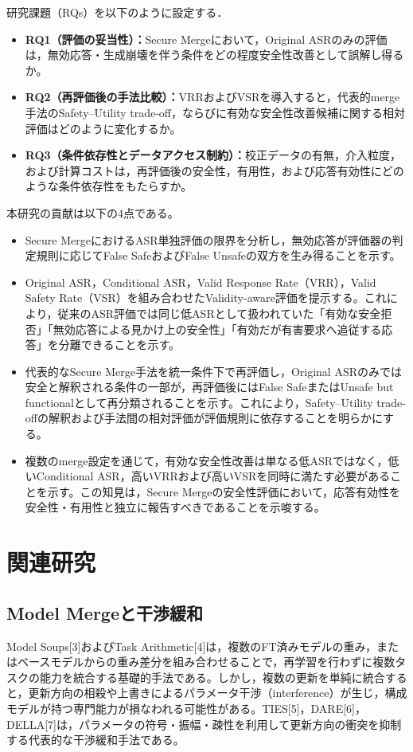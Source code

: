 \documentclass{article}
\begin{document}
研究課題（RQs）を以下のように設定する．
\begin{itemize}
    \item \textbf{RQ1（評価の妥当性）：}Secure Mergeにおいて，Original ASRのみの評価は，無効応答・生成崩壊を伴う条件をどの程度安全性改善として誤解し得るか。
    \item \textbf{RQ2（再評価後の手法比較）：}VRRおよびVSRを導入すると，代表的merge手法のSafety--Utility trade-off，ならびに有効な安全性改善候補に関する相対評価はどのように変化するか。
    \item \textbf{RQ3（条件依存性とデータアクセス制約）：}校正データの有無，介入粒度，および計算コストは，再評価後の安全性，有用性，および応答有効性にどのような条件依存性をもたらすか。
\end{itemize}

本研究の貢献は以下の4点である。
\begin{itemize}
    \item Secure MergeにおけるASR単独評価の限界を分析し，無効応答が評価器の判定規則に応じてFalse SafeおよびFalse Unsafeの双方を生み得ることを示す。
    \item Original ASR，Conditional ASR，Valid Response Rate（VRR），Valid Safety Rate（VSR）を組み合わせたValidity-aware評価を提示する。これにより，従来のASR評価では同じ低ASRとして扱われていた「有効な安全拒否」「無効応答による見かけ上の安全性」「有効だが有害要求へ追従する応答」を分離できることを示す。
    \item 代表的なSecure Merge手法を統一条件下で再評価し，Original ASRのみでは安全と解釈される条件の一部が，再評価後にはFalse SafeまたはUnsafe but functionalとして再分類されることを示す。これにより，Safety--Utility trade-offの解釈および手法間の相対評価が評価規則に依存することを明らかにする。
    \item 複数のmerge設定を通じて，有効な安全性改善は単なる低ASRではなく，低いConditional ASR，高いVRRおよび高いVSRを同時に満たす必要があることを示す。この知見は，Secure Mergeの安全性評価において，応答有効性を安全性・有用性と独立に報告すべきであることを示唆する。
\end{itemize}


\section{関連研究}
\subsection{Model Mergeと干渉緩和}
Model Soups[3]およびTask Arithmetic[4]は，複数のFT済みモデルの重み，またはベースモデルからの重み差分を組み合わせることで，再学習を行わずに複数タスクの能力を統合する基礎的手法である。しかし，複数の更新を単純に統合すると，更新方向の相殺や上書きによるパラメータ干渉（interference）が生じ，構成モデルが持つ専門能力が損なわれる可能性がある。TIES[5]，DARE[6]，DELLA[7]は，パラメータの符号・振幅・疎性を利用して更新方向の衝突を抑制する代表的な干渉緩和手法である。
\end{document}
